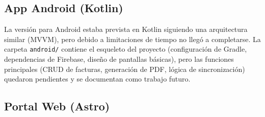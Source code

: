 \subsection{App Android (Kotlin)}

\begin{large}

La versión para Android estaba prevista en Kotlin siguiendo una arquitectura similar (MVVM), pero debido a limitaciones de tiempo no llegó a completarse. La carpeta \texttt{android/} contiene el esqueleto del proyecto (configuración de Gradle, dependencias de Firebase, diseño de pantallas básicas), pero las funciones principales (CRUD de facturas, generación de PDF, lógica de sincronización) quedaron pendientes y se documentan como trabajo futuro.

\end{large}

\subsection{Portal Web (Astro)}

